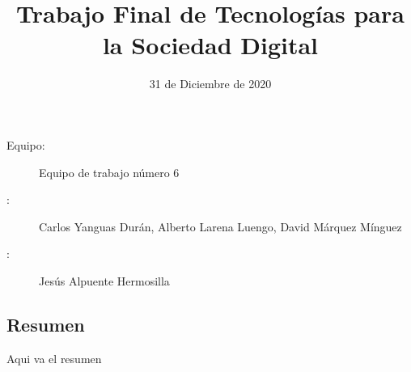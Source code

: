  
  
  

\graphicspath{{../Book/figures/}{../Book/diagrams/}{../Book/photos/}} 

 
\title{Trabajo Final de Tecnologías para la Sociedad Digital}
\date{31 de Diciembre de 2020}
\author{}





\maketitle
\begin{description}                                                      
\item[Equipo:] Equipo de trabajo número 6  
\item[\expandafter\makefirstuc\expandafter{\mybookAutorOrAutora}:] Carlos Yanguas Durán, Alberto Larena Luengo, David Márquez Mínguez   
\item[\expandafter\makefirstuc\expandafter{\mybookTutorOrTutores}:] Jesús Alpuente Hermosilla      
\end{description}  


\begin{center}
\section*{Resumen}
\label{cha:resumen}
\end{center}

Aqui va el resumen


                  




\hypersetup{linkcolor=blue}

                        

